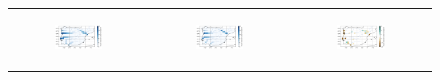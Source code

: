 \begin{figure}[htbp]
\begin{tabular}{ccc}
        \begin{subfigure}[b]{0.33\textwidth}
            \caption{}
            \includegraphics[width=\linewidth]{images/eval_halfdeg/maps/streamr_subgrid.png}
        \end{subfigure} &
        \begin{subfigure}[b]{0.33\textwidth}
            \caption{}
            \includegraphics[width=\linewidth]{images/eval_halfdeg/maps/streamr_interp.png}
        \end{subfigure} &
        \begin{subfigure}[b]{0.33\textwidth}
            \caption{}
            \includegraphics[width=\linewidth]{images/eval_halfdeg/maps/streamr_diff.png}
        \end{subfigure} \\
        

\end{tabular}
\end{figure}
